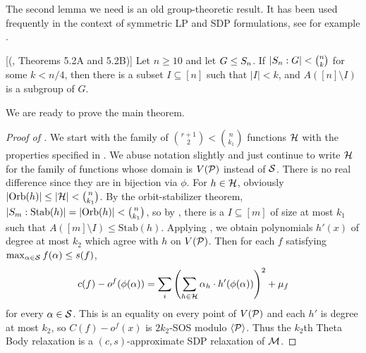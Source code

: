 The second lemma we need is an old group-theoretic result. It has been used frequently in the context of symmetric LP and SDP formulations, see for example \cite{LRST14,KPT10,BFPS12}. 
\begin{lemma}\label{lem:dixandmort}[(\cite{DM96}, Theorems 5.2A and 5.2B)]
Let $n \geq 10$ and let $G \leq S_{n}$. If $|S_{n}: G| < \binom{n}{k}$ for some $k < n/4$, then there is a subset $I \subseteq [n]$ such that $|I| < k$, and $A([n] \setminus I)$ is a subgroup of $G$.
\end{lemma}
We are ready to prove the main theorem.
\begin{proof}[Proof of ]
We start with the family of $\binom{r+1}{2} < \binom{n}{k_1}$ functions $\mathcal H$ with the properties specified in . We abuse notation slightly and just continue to write $\mathcal H$ for the family of functions whose domain is $V(\mathcal P)$ instead of $\mathcal S$. There is no real difference since they are in bijection via $\phi$. For $h \in \mathcal H$, obviously $|\text{Orb}(h)| \leq |\mathcal H| < \binom{n}{k_1}$. By the orbit-stabilizer theorem, $|S_{m} : \text{Stab}(h)| = |\text{Orb}(h)| < \binom{n}{k_1}$, so by , there is a $I \subseteq [m]$ of size at most $k_1$ such that $A([m] \setminus I) \leq \text{Stab}(h)$. Applying , we obtain polynomials $h'(x)$ of degree at most $k_2$ which agree with $h$ on $V(\mathcal P)$. Then for each $f$ satisfying $\max_{\alpha \in \mathcal S} f(\alpha) \leq s(f)$,
\[c(f) - o^f(\phi(\alpha)) = \sum_i \left(\sum_{h \in \mathcal H} \alpha_h \cdot h'(\phi(\alpha))\right)^2 + \mu_f\]
for every $\alpha \in \mathcal S$. This is an equality on every point of $V(\mathcal P)$ and each $h'$ is degree at most $k_2$, so $C(f) - o^f(x)$ is $2k_2$-SOS modulo $\langle \mathcal P \rangle$. Thus the $k_2$th Theta Body relaxation is a $(c,s)$-approximate SDP relaxation of $\mathcal M$. 
\end{proof}


